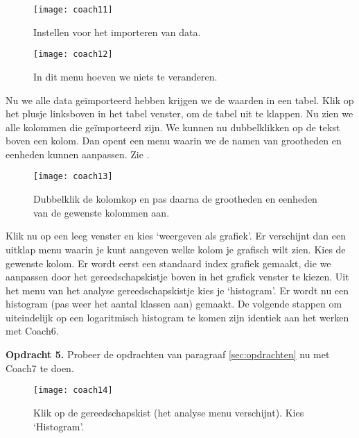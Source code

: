 \begin{figure}
    \centering
    \texttt{[image: coach11]}
    \caption{Instellen voor het importeren van data.}
    \label{fig:coach11}
\end{figure}

\begin{figure}
    \centering
    \texttt{[image: coach12]}
    \caption{In dit menu hoeven we niets te veranderen.}
    \label{fig:coach12}
\end{figure}

Nu we alle data geïmporteerd hebben krijgen we de waarden in een tabel. Klik op het plusje
linksboven in het tabel venster, om de tabel uit te klappen.
Nu zien we alle kolommen die geïmporteerd zijn. We kunnen nu dubbelklikken op 
de tekst boven een kolom. Dan opent een menu waarin we de namen van grootheden en eenheden
kunnen aanpassen. Zie .  

\begin{figure}
    \centering
    \texttt{[image: coach13]}
    \caption{Dubbelklik de kolomkop en pas daarna de grootheden en eenheden 
    van de gewenste kolommen aan.}
    \label{fig:coach13}
\end{figure}

Klik nu op een leeg venster en kies `weergeven als grafiek'. Er verschijnt dan een
uitklap menu waarin je kunt aangeven welke kolom je grafisch wilt zien. 
Kies de gewenste kolom. Er wordt eerst een standaard index grafiek gemaakt, die 
we aanpassen door het gereedschapskistje boven in het grafiek venster te kiezen. 
Uit het menu van het analyse gereedschapskistje kies je `histogram'. Er wordt 
nu een histogram (pas weer het aantal klassen aan) gemaakt. De volgende stappen 
om uiteindelijk op een logaritmisch histogram te komen zijn identiek aan het 
werken met Coach6.
\hspace{3 mm}

\textbf{Opdracht 5.}
Probeer de opdrachten van paragraaf \ref{sec:opdrachten} nu met Coach7 te doen.

\begin{figure}
    \centering
    \texttt{[image: coach14]}
    \caption{Klik op de gereedschapskist (het analyse menu verschijnt). Kies `Histogram'.}
    \label{fig:coach14}
\end{figure}


